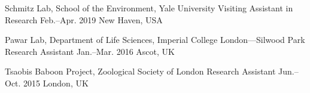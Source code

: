 

\begin{cventries}

  \cventry
    {Schmitz Lab, School of the Environment, Yale University} %
    {Visiting Assistant in Research} %
    {Feb.--Apr. 2019} %
    {New Haven, USA} %
    {}

    
  \cventry
    {Pawar Lab, Department of Life Sciences, Imperial College London---Silwood Park} %
    {Research Assistant} %
    {Jan.--Mar. 2016} %
    {Ascot, UK} %
    {}

    
  \cventry
    {Tsaobis Baboon Project, Zoological Society of London} %
    {Research Assistant} %
    {Jun.--Oct. 2015} %
    {London, UK} %
    {}

    

\end{cventries}
